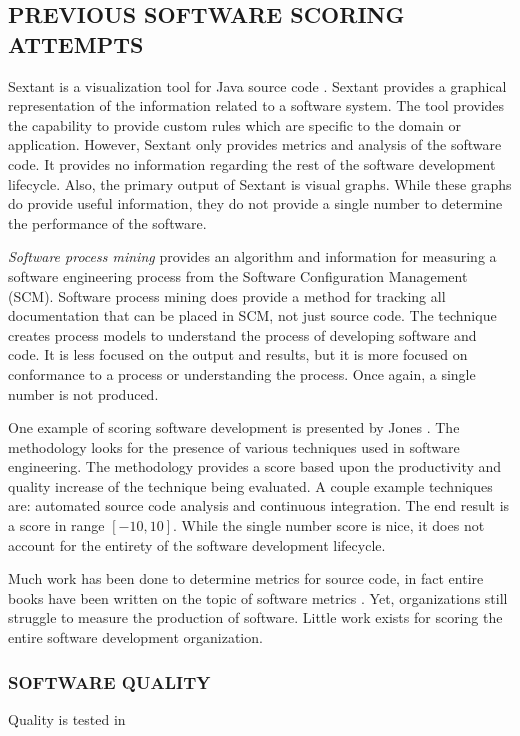 \documentclass[SDSUThesis.tex]{subfiles}
\begin{document}
\subsection{PREVIOUS SOFTWARE SCORING ATTEMPTS }

Sextant is a visualization tool for Java source code \cite{Winter2013}.  Sextant provides a graphical representation of the information related 
to a software system.  The tool provides the capability to provide custom rules which are specific to the domain or application.  However,
Sextant only provides metrics and analysis of the software code.  It provides no information regarding the rest of the 
software development lifecycle.  Also, the primary output of Sextant is visual graphs.  While these graphs do provide
useful information, they do not provide a single number to determine the performance of the software.

\textit{Software process mining} \cite{Rubin2007} provides
an algorithm and information for measuring a software engineering process from
the Software Configuration Management (SCM). Software process mining does provide a method for tracking all 
documentation that can be placed in SCM, not just source code.  The technique creates process models 
to understand the process of developing software and code. It is less focused on the output and results,
but it is more focused on conformance to a process or understanding the process. Once again, a single number is not produced.

One example of scoring software development is presented by Jones \cite{Jones2012}. The methodology looks
for the presence of various techniques used in software engineering.  The methodology provides a score based upon the 
productivity and quality increase of the technique being evaluated.  A couple example techniques are: 
automated source code analysis and continuous integration.  The end result is a score in range $[-10,10]$. 
While the single number score is nice, it does not account for the entirety of the software development lifecycle.

Much work has been done to determine metrics for source code, in fact 
entire books have been written on the topic of software metrics \cite{Jones1996, Putnam2013}. Yet, 
organizations still struggle to measure the production of software.
Little work exists
for scoring the entire software development organization. 

\subsubsection{SOFTWARE QUALITY}
Quality is tested in \cite{Miguel2014}
\end{document}
